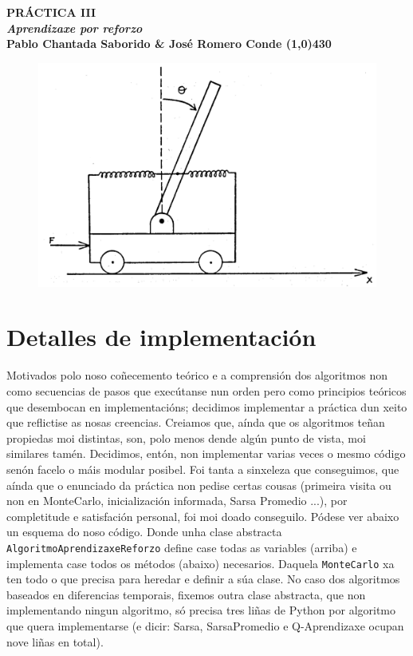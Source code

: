 \documentclass{article}
\begin{document}
\begin{center}
    \LARGE\bfseries PRÁCTICA III \\
    \large \emph{Aprendizaxe por reforzo} \\
    \small Pablo Chantada Saborido \& José Romero Conde
    \line(1,0){430}
\end{center}

\vspace{200}
\begin{figure}[h]
    \centering
    \includegraphics[width=1\linewidth]{portada.png}
    
\end{figure}

\thispagestyle{empty}
\newpage

\section{Detalles de implementación}

Motivados polo noso coñecemento teórico e a comprensión dos algoritmos non como secuencias de pasos que execútanse nun orden pero como principios teóricos que desembocan en implementacións; decidimos implementar a práctica dun xeito que reflictise as nosas creencias. Creiamos que, aínda que os algoritmos teñan propiedas moi distintas, son, polo menos dende algún punto de vista, moi similares tamén. Decidimos, entón, non implementar varias veces o mesmo código senón facelo o máis modular posibel. Foi tanta a sinxeleza que conseguimos, que aínda que o enunciado da práctica non pedise certas cousas (primeira visita ou non en MonteCarlo, inicialización informada, Sarsa Promedio ...), por completitude e satisfación personal, foi moi doado conseguilo. Pódese ver abaixo un esquema do noso código. Donde unha clase abstracta \texttt{AlgoritmoAprendizaxeReforzo} define case todas as variables (arriba) e implementa case todos os métodos (abaixo) necesarios. Daquela \texttt{MonteCarlo} xa ten todo o que precisa para heredar e definir a súa clase. No caso dos algoritmos baseados en diferencias temporais, fixemos outra clase abstracta, que non implementando ningun algoritmo, só precisa tres liñas de Python por algoritmo que quera implementarse (e dicir: Sarsa, SarsaPromedio e Q-Aprendizaxe ocupan nove liñas en total).
\end{document}
